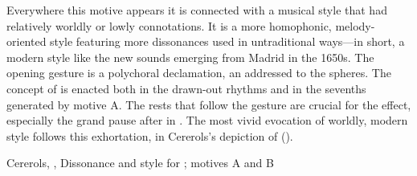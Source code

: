 Everywhere this motive appears it is connected with a musical style that had
relatively worldly or lowly connotations.
It is a more homophonic, melody-oriented style featuring more dissonances used
in untraditional ways---in short, a modern style like the new sounds
emerging from Madrid in the 1650s.
The opening gesture is a polychoral declamation, an  addressed to
the spheres.
The concept of  is enacted both in the drawn-out rhythms and
in the sevenths generated by motive A.
The rests that follow the gesture are crucial for the effect, especially the
grand pause after  in .
The most vivid evocation of worldly, modern style follows this exhortation, in
Cererols's depiction of  ().


\begin{musicexample}
    \caption{Cererols, , Dissonance and
     style for ; motives A and
    B} 
    \label{mus:Cererols-Suspended-consonancia}
\end{musicexample}

